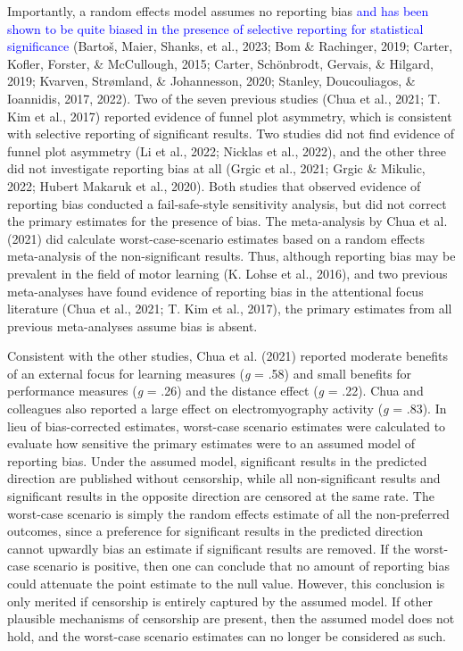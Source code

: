 \documentclass[
  man, donotrepeattitle,floatsintext]{apa7}
\begin{document}
Importantly, a random effects model assumes no reporting bias \textcolor{blue}{and has been shown to be quite biased in the presence of selective reporting for statistical significance} (Bartoš, Maier, Shanks, et al., 2023; Bom \& Rachinger, 2019; Carter, Kofler, Forster, \& McCullough, 2015; Carter, Schönbrodt, Gervais, \& Hilgard, 2019; Kvarven, Strømland, \& Johannesson, 2020; Stanley, Doucouliagos, \& Ioannidis, 2017, 2022). Two of the seven previous studies (Chua et al., 2021; T. Kim et al., 2017) reported evidence of funnel plot asymmetry, which is consistent with selective reporting of significant results. Two studies did not find evidence of funnel plot asymmetry (Li et al., 2022; Nicklas et al., 2022), and the other three did not investigate reporting bias at all (Grgic et al., 2021; Grgic \& Mikulic, 2022; Hubert Makaruk et al., 2020). Both studies that observed evidence of reporting bias conducted a fail-safe-style sensitivity analysis, but did not correct the primary estimates for the presence of bias. The meta-analysis by Chua et al. (2021) did calculate worst-case-scenario estimates based on a random effects meta-analysis of the non-significant results. Thus, although reporting bias may be prevalent in the field of motor learning (K. Lohse et al., 2016), and two previous meta-analyses have found evidence of reporting bias in the attentional focus literature (Chua et al., 2021; T. Kim et al., 2017), the primary estimates from all previous meta-analyses assume bias is absent.

Consistent with the other studies, Chua et al. (2021) reported moderate benefits of an external focus for learning measures (\emph{g} = .58) and small benefits for performance measures (\emph{g} = .26) and the distance effect (\emph{g} = .22). Chua and colleagues also reported a large effect on electromyography activity (\emph{g} = .83). In lieu of bias-corrected estimates, worst-case scenario estimates were calculated to evaluate how sensitive the primary estimates were to an assumed model of reporting bias. Under the assumed model, significant results in the predicted direction are published without censorship, while all non-significant results and significant results in the opposite direction are censored at the same rate. The worst-case scenario is simply the random effects estimate of all the non-preferred outcomes, since a preference for significant results in the predicted direction cannot upwardly bias an estimate if significant results are removed. If the worst-case scenario is positive, then one can conclude that no amount of reporting bias could attenuate the point estimate to the null value. However, this conclusion is only merited if censorship is entirely captured by the assumed model. If other plausible mechanisms of censorship are present, then the assumed model does not hold, and the worst-case scenario estimates can no longer be considered as such.
\end{document}
